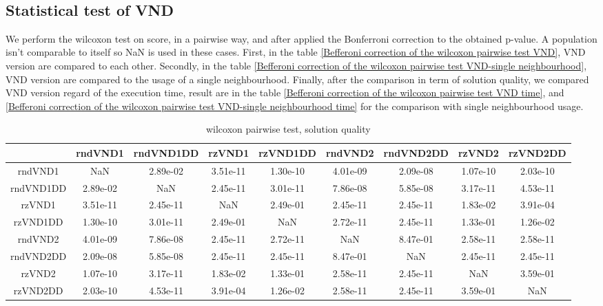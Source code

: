 \documentclass[12pt,a4paper]{article}
\begin{document}
~\\

\subsection{Statistical test of VND}
 
We perform the wilcoxon test on score, in a pairwise way, and after applied the Bonferroni correction to the obtained p-value. A population isn't comparable to itself so NaN is used in these cases. First, in the table \ref{Befferoni correction of the wilcoxon pairwise test VND}, VND version are compared to each other. Secondly, in the table \ref{Befferoni correction of the wilcoxon pairwise test VND-single neighbourhood}, VND version are compared to the usage of a single neighbourhood. Finally, after the comparison in term of solution quality, we compared VND version regard of the execution time, result are in the table \ref{Befferoni correction of the wilcoxon pairwise test VND time}, and \ref{Befferoni correction of the wilcoxon pairwise test VND-single neighbourhood time} for the comparison with single neighbourhood usage.
 
\begin{table}[!h]
\leftskip -1.6cm
{
\footnotesize
\begin{tabular}{|*{9}{c|}}
  \hline
& rndVND1 & rndVND1DD & rzVND1 & rzVND1DD & rndVND2 & rndVND2DD & rzVND2 & rzVND2DD \\
\hline
rndVND1 & NaN & 2.89e-02 & 3.51e-11 & 1.30e-10 & 4.01e-09 & 2.09e-08 & 1.07e-10 & 2.03e-10 \\
rndVND1DD & 2.89e-02 & NaN & 2.45e-11 & 3.01e-11 & 7.86e-08 & 5.85e-08 & 3.17e-11 & 4.53e-11 \\
rzVND1 & 3.51e-11 & 2.45e-11 & NaN & 2.49e-01 & 2.45e-11 & 2.45e-11 & 1.83e-02 & 3.91e-04 \\
rzVND1DD & 1.30e-10 & 3.01e-11 & 2.49e-01 & NaN & 2.72e-11 & 2.45e-11 & 1.33e-01 & 1.26e-02 \\
rndVND2 & 4.01e-09 & 7.86e-08 & 2.45e-11 & 2.72e-11 & NaN & 8.47e-01 & 2.58e-11 & 2.58e-11 \\
rndVND2DD & 2.09e-08 & 5.85e-08 & 2.45e-11 & 2.45e-11 & 8.47e-01 & NaN & 2.45e-11 & 2.45e-11 \\
rzVND2 & 1.07e-10 & 3.17e-11 & 1.83e-02 & 1.33e-01 & 2.58e-11 & 2.45e-11 & NaN & 3.59e-01 \\
rzVND2DD & 2.03e-10 & 4.53e-11 & 3.91e-04 & 1.26e-02 & 2.58e-11 & 2.45e-11 & 3.59e-01 & NaN \\
  \hline
\end{tabular}
\normalsize
}
\caption{wilcoxon pairwise test, solution quality}
\label{wilcoxon pairwise test VND}
\end{table} 
\end{document}
